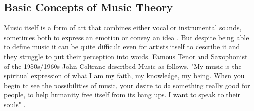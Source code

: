 \subsection{Basic Concepts of Music Theory}


Music itself is a form of art that combines either vocal or instrumental sounds,
sometimes both to express an emotion or convey an idea \cite{Becker2021WhatIsMusic}.
But despite being able to define music it can be quite difficult even for artists itself to describe
it and they struggle to put their perception into words. Famous Tenor and Saxophonist of
the 1950s/1960s John Coltrane described Music as follows.
"My music is the spiritual expression of what I am my faith, my knowledge, my being.
When you begin to see the possibilities of music, your desire to do something really good for people,
to help humanity free itself from its hang ups. I want to speak to their souls" \cite{Havers2021Sax}.

